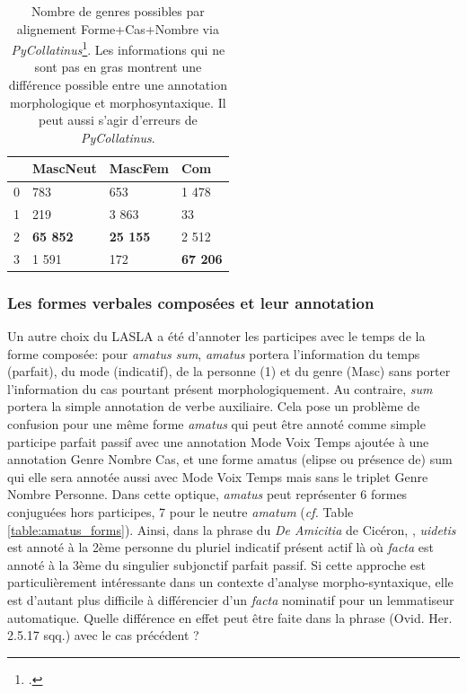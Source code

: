 \begin{table}[h]
\centering
\begin{tabular}{l|lll}
\toprule
         & MascNeut & MascFem & Com    \\ \midrule
0        & 783      & 653     & 1 478  \\
1        & 219      & 3 863   & 33     \\
2        & \textbf{65 852}   & \textbf{25 155}  & 2 512  \\
3        & 1 591    & 172     & \textbf{67 206} \\ \bottomrule
\end{tabular}
\caption{Nombre de genres possibles par alignement Forme+Cas+Nombre via \textit{PyCollatinus}\footcite[\textit{PyCollatinus} est une traduction en python de \textit{Collatinus, cf. }]{thibault_clerice_2018_1243076}. Les informations qui ne sont pas en gras montrent une différence possible entre une annotation morphologique et morphosyntaxique. Il peut aussi s'agir d'erreurs de \textit{PyCollatinus}.}
\label{table:lasla:genders-alignement}
\end{table}

\subsubsection{Les formes verbales composées et leur annotation}

Un autre choix du LASLA a été d'annoter les participes avec le temps de la forme composée: pour \textit{amatus sum}, \textit{amatus} portera l'information du temps (parfait), du mode (indicatif), de la personne (1) et du genre (Masc) sans porter l'information du cas pourtant présent morphologiquement. Au contraire, \textit{sum} portera la simple annotation de verbe auxiliaire. Cela pose un problème de confusion pour une même forme \textit{amatus} qui peut être annoté comme simple participe parfait passif avec une annotation Mode Voix Temps ajoutée à une annotation Genre Nombre Cas, et une forme amatus (elipse ou présence de) sum qui elle sera annotée aussi avec Mode Voix Temps mais sans le triplet Genre Nombre Personne. Dans cette optique, \textit{amatus} peut représenter 6 formes conjuguées hors participes, 7 pour le neutre \textit{amatum} (\textit{cf.} Table \ref{table:amatus_forms}). %
%
%
Ainsi, dans la phrase du \textit{De Amicitia} de Cicéron, , \textit{uidetis} est annoté à la 2ème personne du pluriel indicatif présent actif là où \textit{facta} est annoté à la 3ème du singulier subjonctif parfait passif. Si cette approche est particulièrement intéressante dans un contexte d'analyse morpho-syntaxique, elle est d'autant plus difficile à différencier d'un \textit{facta} nominatif pour un lemmatiseur automatique. Quelle différence en effet peut être faite dans la phrase  (Ovid. Her. 2.5.17 sqq.) avec le cas précédent ? %

